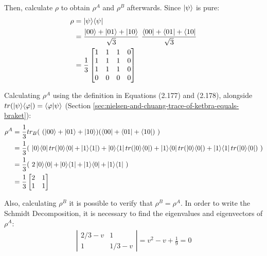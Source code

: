 \begin{enumerate}
        Then, calculate $\rho$ to obtain $\rho^A$ and $\rho^B$ afterwards.
        Since $\ket{\psi}$ is pure:
        \begin{align}
            \rho &= \ketbra{\psi}{\psi} \\
            &= \frac{\ket{00} + \ket{01} + \ket{10}}{\sqrt3} \ 
                \frac{\bra{00} + \bra{01} + \bra{10}}{\sqrt3} \\
            &= \frac{1}{3} \left[ \begin{matrix}
                    1 & 1 & 1 & 0 \\ 1 & 1 & 1 & 0 \\
                    1 & 1 & 1 & 0 \\ 0 & 0 & 0 & 0
                \end{matrix} \right]
        \end{align}
        
        Calculating $\rho^A$ using the definition in Equations (2.177) and (2.178),
        alongside $tr(\mathop{\mathinner{ |{\psi}\rangle \langle{\varphi}|}}) = \mathop{\mathinner{ \langle{\varphi}|{\psi}\rangle}}$
        (Section \ref{sec:nielsen-and-chuang-trace-of-ketbra-equals-braket}):
        \begin{align}
            \rho^A &= \frac{1}{3} tr_B(\ (\ket{00} + \ket{01} + \ket{10})
                (\bra{00} + \bra{01} + \bra{10})\ ) \\
            &= \frac{1}{3} (\ \mathop{\mathinner{ |{0}\rangle \langle{0}|}} tr(\mathop{\mathinner{ |{0}\rangle \langle{0}|}} + \mathop{\mathinner{ |{1}\rangle \langle{1}|}}) +
                \mathop{\mathinner{ |{0}\rangle \langle{1}|}} tr(\mathop{\mathinner{ |{0}\rangle \langle{0}|}}) +
                \mathop{\mathinner{ |{1}\rangle \langle{0}|}} tr(\mathop{\mathinner{ |{0}\rangle \langle{0}|}}) +
                \mathop{\mathinner{ |{1}\rangle \langle{1}|}} tr(\mathop{\mathinner{ |{0}\rangle \langle{0}|}})
                \ ) \\
            &= \frac{1}{3} (\ 2 \mathop{\mathinner{ |{0}\rangle \langle{0}|}} + \mathop{\mathinner{ |{0}\rangle \langle{1}|}} + \mathop{\mathinner{ |{1}\rangle \langle{0}|}} +
                \mathop{\mathinner{ |{1}\rangle \langle{1}|}} \ ) \\
            &= \frac{1}{3} \left[ \begin{matrix}
                2 & 1 \\ 1 & 1
                \end{matrix} \right]
        \end{align}
        
        Also, calculating $\rho^B$ it is possible to verify that $\rho^B = \rho^A$.
        In order to write the Schmidt Decomposition, it is necessary to find the
        eigenvalues and eigenvectors of $\rho^A$:
        \begin{align}
            \left| \begin{matrix}
            2/3 - v & 1 \\ 1 & 1/3 - v
            \end{matrix} \right|
            = v^2 - v + \frac{1}{9} = 0
        \end{align}
        

\end{enumerate}
